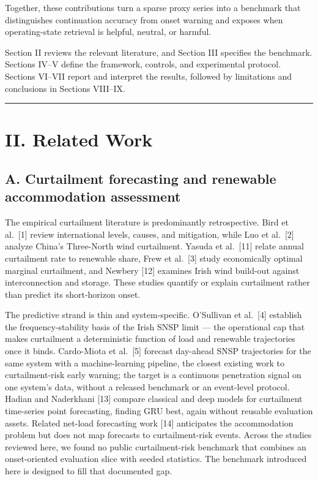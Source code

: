 \documentclass[
  10pt,
  a4paper,
]{article}
\begin{document}
Together, these contributions turn a sparse proxy series into a
benchmark that distinguishes continuation accuracy from onset warning
and exposes when operating-state retrieval is helpful, neutral, or
harmful.

Section II reviews the relevant literature, and Section III specifies
the benchmark. Sections IV--V define the framework, controls, and
experimental protocol. Sections VI--VII report and interpret the
results, followed by limitations and conclusions in Sections VIII--IX.

\begin{center}\rule{0.5\linewidth}{0.5pt}\end{center}

\section{II. Related Work}\label{ii.-related-work}

\subsection{A. Curtailment forecasting and renewable accommodation
assessment}\label{a.-curtailment-forecasting-and-renewable-accommodation-assessment}

The empirical curtailment literature is predominantly retrospective.
Bird et al.~{[}1{]} review international levels, causes, and mitigation,
while Luo et al.~{[}2{]} analyze China's Three-North wind curtailment.
Yasuda et al.~{[}11{]} relate annual curtailment rate to renewable
share, Frew et al.~{[}3{]} study economically optimal marginal
curtailment, and Newbery {[}12{]} examines Irish wind build-out against
interconnection and storage. These studies quantify or explain
curtailment rather than predict its short-horizon onset.

The predictive strand is thin and system-specific. O'Sullivan et
al.~{[}4{]} establish the frequency-stability basis of the Irish SNSP
limit --- the operational cap that makes curtailment a deterministic
function of load and renewable trajectories once it binds. Cardo-Miota
et al.~{[}5{]} forecast day-ahead SNSP trajectories for the same system
with a machine-learning pipeline, the closest existing work to
curtailment-risk early warning; the target is a continuous penetration
signal on one system's data, without a released benchmark or an
event-level protocol. Hadian and Naderkhani {[}13{]} compare classical
and deep models for curtailment time-series point forecasting, finding
GRU best, again without reusable evaluation assets. Related net-load
forecasting work {[}14{]} anticipates the accommodation problem but does
not map forecasts to curtailment-risk events. Across the studies
reviewed here, we found no public curtailment-risk benchmark that
combines an onset-oriented evaluation slice with seeded statistics. The
benchmark introduced here is designed to fill that documented gap.
\end{document}

